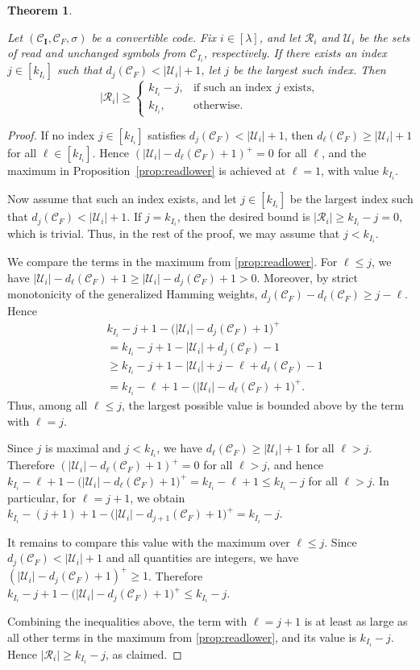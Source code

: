 \documentclass[conference, 10pt]{IEEEtran}
\theoremstyle{plain}
\newtheorem{theorem}{Theorem}
\theoremstyle{definition}
\newcommand{\mC}{\mathcal{C}}
\newcommand{\mU}{\mathcal{U}}
\newcommand{\mR}{\mathcal{R}}
\begin{document}
\begin{theorem}\label{thm:readlowergen}

Let $(\mC_{\mathbf I},\mC_F,\sigma)$ be a convertible code. Fix $i\in[\lambda]$, and let $\mR_i$ and $\mU_i$ be the sets of read and unchanged symbols from $\mC_{I_i}$, respectively. If there exists an index $j\in[k_{I_i}]$ such that $d_j(\mC_F)<|\mU_i|+1$, let $j$ be the largest such index. Then \[ |\mR_i| \geq \begin{cases} k_{I_i}-j, & \text{if such an index } j \text{ exists},\\ k_{I_i}, & \text{otherwise}. \end{cases} \]
\end{theorem}


\begin{proof}
If no index $j\in[k_{I_i}]$ satisfies $d_j(\mC_F)<|\mU_i|+1$, then
$d_\ell(\mC_F)\ge |\mU_i|+1$ for all $\ell\in[k_{I_i}]$. Hence $(|\mU_i|-d_\ell(\mC_F)+1)^+=0$ for all $\ell$, and the maximum in Proposition~\ref{prop:readlower} is achieved at $\ell=1$, with value $k_{I_i}$. 

Now assume that such an index exists, and let $j\in[k_{I_i}]$ be the largest index such that
$d_j(\mC_F)<|\mU_i|+1$. If $j=k_{I_i}$, then the desired bound is
$|\mR_i|\ge k_{I_i}-j=0$, which is trivial. Thus, in the rest of the proof,
we may assume that $j<k_{I_i}$.

We compare the terms in the maximum from \cref{prop:readlower}.
For $\ell\le j$, we have
$|\mU_i|-d_\ell(\mC_F)+1\ge |\mU_i|-d_j(\mC_F)+1>0$. Moreover, by strict
monotonicity of the generalized Hamming weights,
$d_j(\mC_F)-d_\ell(\mC_F)\ge j-\ell$. Hence
\begin{align*}
&k_{I_i}-j+1-\bigl(|\mU_i|-d_j(\mC_F)+1\bigr)^+\\
&=
k_{I_i}-j+1-|\mU_i|+d_j(\mC_F)-1 \\
&\ge
k_{I_i}-j+1-|\mU_i|+j-\ell+d_\ell(\mC_F)-1 \\
&=
k_{I_i}-\ell+1-\bigl(|\mU_i|-d_\ell(\mC_F)+1\bigr)^+ .
\end{align*}
Thus, among all $\ell\le j$, the largest possible value is bounded above by the term with $\ell=j$.

Since $j$ is maximal and $j<k_{I_i}$, we have
$d_\ell(\mC_F)\ge |\mU_i|+1$ for all $\ell>j$. Therefore
$(|\mU_i|-d_\ell(\mC_F)+1)^+=0$ for all $\ell>j$, and hence $k_{I_i}-\ell+1-\bigl(|\mU_i|-d_\ell(\mC_F)+1\bigr)^+
=
k_{I_i}-\ell+1
\le
k_{I_i}-j$ for all $\ell>j$. In particular, for $\ell=j+1$, we obtain $k_{I_i}-(j+1)+1-\bigl(|\mU_i|-d_{j+1}(\mC_F)+1\bigr)^+
=
k_{I_i}-j$.

It remains to compare this value with the maximum over $\ell\le j$. Since
$d_j(\mC_F)<|\mU_i|+1$ and all quantities are integers, we have
$(|\mU_i|-d_j(\mC_F)+1)^+\ge 1$. Therefore $k_{I_i}-j+1-\bigl(|\mU_i|-d_j(\mC_F)+1\bigr)^+
\le
k_{I_i}-j$.

Combining the inequalities above, the term with $\ell=j+1$ is at least as large as all other terms in the maximum from \cref{prop:readlower}, and its value is $k_{I_i}-j$. Hence
$|\mR_i|\ge k_{I_i}-j$, as claimed.
    \end{proof}
\end{document}
